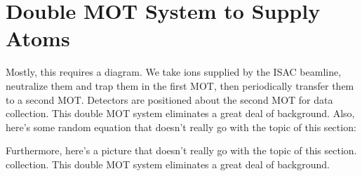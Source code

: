 \section{Double MOT System to Supply Atoms}
	Mostly, 
	this requires a diagram.  We take ions supplied by the ISAC beamline, neutralize them and trap them in the first MOT, then periodically transfer them to a second MOT.  Detectors are 
	positioned about the second MOT for data 
	collection.  This double MOT system eliminates a great deal of background.  
	Also, here's some random equation that doesn't really go with the topic of this section:
	
	Furthermore, here's a picture that doesn't really go with the topic of this section.
	collection.  This double MOT system 
	eliminates a great deal of background.  
	
	
